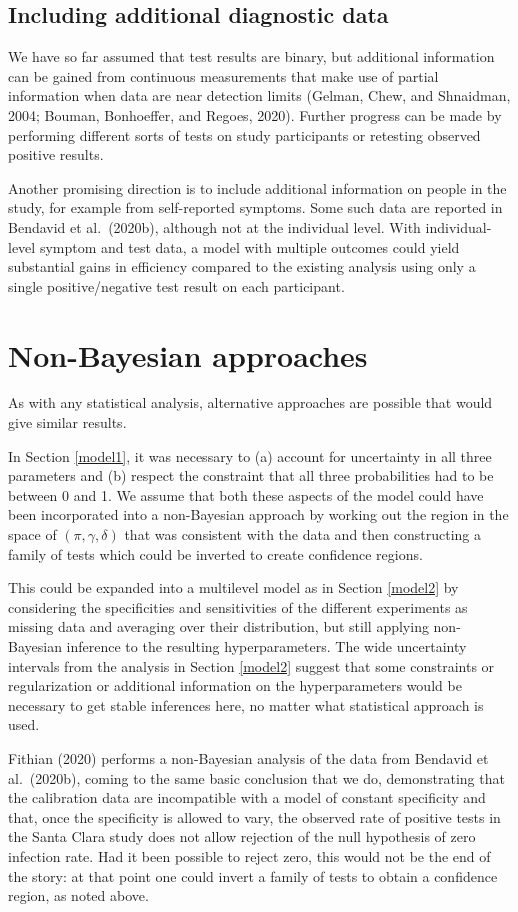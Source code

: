 \documentclass[11pt]{article}
\begin{document}
\subsection{Including additional diagnostic data}
We have so far assumed that test results are binary, but additional information can be gained from continuous measurements that make use of partial information when data are near detection limits (Gelman, Chew, and Shnaidman, 2004; Bouman, Bonhoeffer, and Regoes, 2020).  Further progress can be made by performing different sorts of tests on study participants or retesting observed positive results.

Another promising direction is to include additional information on people in the study, for example from self-reported symptoms.  Some such data are reported in Bendavid et al.\ (2020b), although not at the individual level. With individual-level symptom and test data, a model with multiple outcomes could yield substantial gains in efficiency compared to the existing analysis using only a single positive/negative test result on each participant.

\section{Non-Bayesian approaches}
As with any statistical analysis, alternative approaches are possible that would give similar results.

In Section \ref{model1}, it was necessary to (a) account for uncertainty in all three parameters and (b) respect the constraint that all three probabilities had to be between 0 and 1.  We assume that both these aspects of the model could have been incorporated into a non-Bayesian approach by working out the region in the space of $(\pi,\gamma,\delta)$ that was consistent with the data and then constructing a family of tests which could be inverted to create confidence regions.

This could be expanded into a multilevel model as in Section \ref{model2} by considering the specificities and sensitivities of the different experiments as missing data and averaging over their distribution, but still applying non-Bayesian inference to the resulting hyperparameters.  The wide uncertainty intervals from the analysis in Section \ref{model2} suggest that some constraints or regularization or additional information on the hyperparameters would be necessary to get stable inferences here, no matter what statistical approach is used.

Fithian (2020) performs a non-Bayesian analysis of the data from Bendavid et al.\ (2020b), coming to the same basic conclusion that we do, demonstrating that the calibration data are incompatible with a model of constant specificity and that, once the specificity is allowed to vary, the observed rate of positive tests in the Santa Clara study does not allow rejection of the null hypothesis of zero infection rate.  Had it been possible to reject zero, this would not be the end of the story:  at that point one could invert a family of tests to obtain a confidence region, as noted above.
\end{document}
